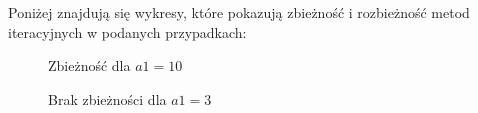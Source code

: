 \documentclass{article}
\begin{document}
Poniżej znajdują się wykresy, które pokazują zbieżność i rozbieżność metod iteracyjnych w podanych przypadkach:

\begin{figure}[h!]%
    \centering
    \qquad
    \caption{Zbieżność dla $a1=10$}%
    \label{fig:example}%
\end{figure}

\begin{figure}[h!]%
    \centering
    \qquad
    \caption{Brak zbieżności dla $a1=3$}%
    \label{fig:example}%
\end{figure}
\end{document}
